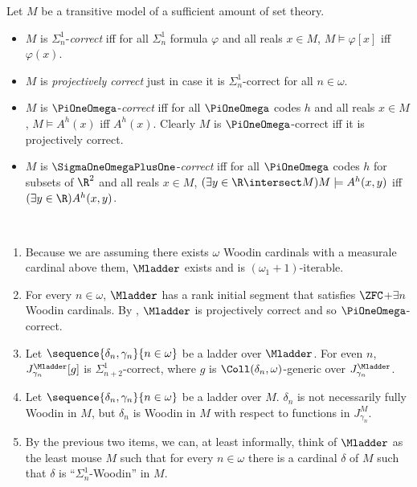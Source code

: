 \documentclass[oneside,12pt]{amsart}
\begin{document}
\begin{definition}
Let $M$ be a transitive model of a sufficient amount of set theory. 
\begin{itemize}
\item $M$ is 
$\Sigma^1_n$-\emph{correct} iff for all $\Sigma^1_n$ formula $\varphi$ and all
reals $x\in M$, $M\models\varphi[x]$ iff $\varphi(x)$. 
\item $M$ is \emph{projectively correct}
just in case it is $\Sigma^1_n$-correct for all $n\in\omega$.
\item $M$ is $\PiOneOmega$-\emph{correct} iff for all $\PiOneOmega$ codes $h$
and all reals $x\in M$, $M \models A^h(x)$ iff $A^h(x)$. Clearly
$M$ is $\PiOneOmega$-correct iff it is projectively correct.
\item $M$ is $\SigmaOneOmegaPlusOne$-\emph{correct} iff for all $\PiOneOmega$ codes $h$ for subsets of $\R^2$ and all reals $x\in M$,
$(\exists y \in \R\intersect M) M\models A^h(x,y)$ iff
$(\exists y \in \R) A^h(x,y)$.
\end{itemize}
\end{definition}

\begin{remarks} \
\begin{enumerate}
\item Because we are assuming there exists $\omega$ Woodin cardinals with a measurale cardinal above them, $\Mladder$ exists and is $(\omega_1+1)$-iterable.
\item For every $n\in\omega$, $\Mladder$ has a rank initial segment that satisfies
$\ZFC$+$\exists n$ Woodin cardinals.  By \cite{Proj_WO_In_Mod}, $\Mladder$ is projectively correct and so $\PiOneOmega$-correct.
\item Let $\sequence{\delta_n,\gamma_n}{n\in\omega}$ be a ladder over $\Mladder$.
For even $n$, $J^{\Mladder}_{\gamma_n}[g]$ is $\Sigma^1_{n+2}$-correct,
where $g$ is $\Coll(\delta_n,\omega)$-generic over $J^{\Mladder}_{\gamma_n}$.
\item Let $\sequence{\delta_n,\gamma_n}{n\in\omega}$ be a ladder over $M$.
$\delta_n$ is not necessarily fully Woodin in $M$, but $\delta_n$ is Woodin in $M$
with respect to functions in $J^M_{\gamma_n}$.
\item By the previous two items, we can, at least informally, think of
$\Mladder$ as the least mouse
$M$ such that for every $n\in\omega$ there is a cardinal $\delta$ of $M$ such
that $\delta$ is ``$\Sigma^1_n$-Woodin'' in $M$.
\end{enumerate}
\end{remarks}
\end{document}
